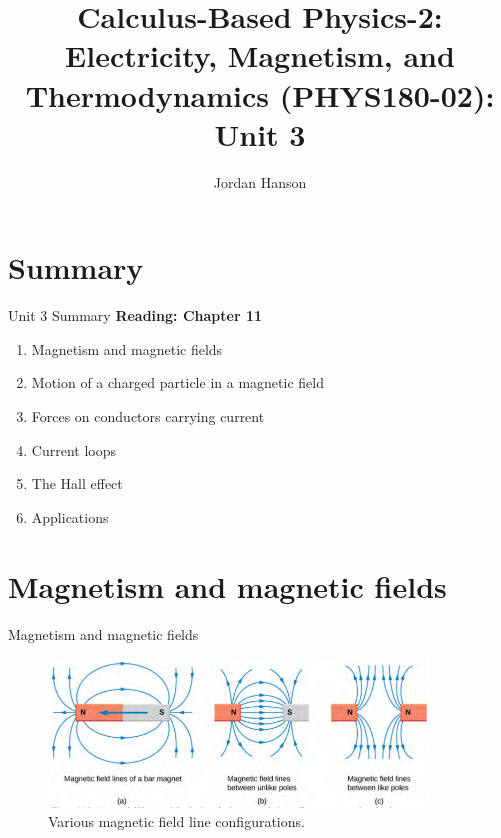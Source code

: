 \documentclass{beamer}
\title{Calculus-Based Physics-2: Electricity, Magnetism, and Thermodynamics (PHYS180-02): Unit 3}
\author{Jordan Hanson}
\institute{Whittier College Department of Physics and Astronomy}
\begin{document}
\maketitle

\section{Summary}

\begin{frame}{Unit 3 Summary}
\textbf{Reading: Chapter 11}
\begin{enumerate}
\item Magnetism and magnetic fields
\item Motion of a charged particle in a magnetic field
\item Forces on conductors carrying current
\item Current loops
\item The Hall effect
\item Applications
\end{enumerate}
\end{frame}

\section{Magnetism and magnetic fields}

\begin{frame}{Magnetism and magnetic fields}
\begin{figure}
\centering
\includegraphics[width=0.9\textwidth,trim=0cm 1cm 0cm 0cm,clip=true]{figures/fields1.png}
\caption{\label{fields1} Various magnetic field line configurations.}
\end{figure}
\end{frame}
\end{document}
